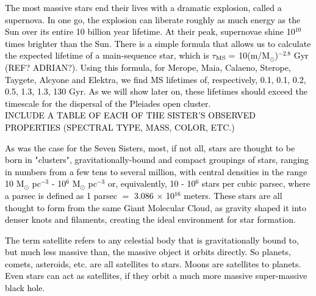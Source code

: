 \documentclass[main.tex]{subfiles}
\begin{document}
\begin{tcolorbox}[sharp corners, colback=blue!30, colframe=blue!80!blue, title=Box \refstepcounter{educhap1}\label{boxchap1:super }\ref{boxchap1:super} -- Supernovae and Stellar Lifetimes]
\par \textcolor{black} {The most massive stars end their lives with a dramatic explosion, called a supernova.  In one go, the explosion can liberate roughly as much energy as the Sun over its entire 10 billion year lifetime.  At their peak, supernovae shine 10$^{10}$ times brighter than the Sun.  There is a simple formula that allows us to calculate the expected lifetime of a main-sequence star, which is $\tau_{\rm MS} =$ 10(m/M$_{\odot}$)$^{-2.8}$ Gyr (REF? ADRIAN?).  Using this formula, for Merope, Maia, Calaeno, Sterope, Taygete, Alcyone and Elektra, we find MS lifetimes of, respectively, 0.1, 0.1, 0.2, 0.5, 1.3, 1.3, 130 Gyr.  As we will show later on, these lifetimes should exceed the timescale for the dispersal of the Pleiades open cluster. \\
INCLUDE A TABLE OF EACH OF THE SISTER'S OBSERVED PROPERTIES (SPECTRAL TYPE, MASS, COLOR, ETC.)}
\end{tcolorbox}

\begin{tcolorbox}[sharp corners, colback=blue!30, colframe=blue!80!blue, title=Box \refstepcounter{educhap1}\label{boxchap1:starclus}\ref{boxchap1:starclus} -- Star Clusters]
\par \textcolor{black} {As was the case for the Seven Sisters, most, if not all, stars are thought to be born in "clusters", gravitationally-bound and compact groupings of stars, ranging in numbers from a few tens to several million, with central densities in the range 10 M$_{\odot}$ pc$^{-3}$ - 10$^6$ M$_{\odot}$ pc$^{-3}$ or, equivalently, 10 - 10$^6$ stars per cubic parsec, where a parsec is defined as 1 parsec $=$ 3.086 $\times$ 10$^{16}$ meters.  These stars are all thought to form from the same Giant Molecular Cloud, as gravity shaped it into denser knots and filaments, creating the ideal environment for star formation.}  
\end{tcolorbox} 

\begin{tcolorbox}[sharp corners, colback=red!30, colframe=red!80!blue, title=Box \refstepcounter{educhap1}\label{boxchap1:satellites}\ref{boxchap1:satellites} -- Satellites]
\par \textcolor{black} {The term satellite refers to any celestial body that is gravitationally bound to, but much less massive than, the massive object it orbits directly.  So planets, comets, asteroids, etc. are all satellites to stars.  Moons are satellites to planets.  Even stars can act as satellites, if they orbit a much more massive super-massive black hole.} 
\end{tcolorbox} 
\end{document}
